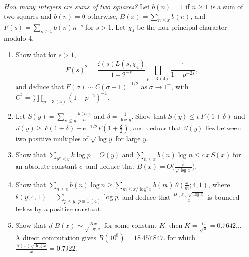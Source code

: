 \begin{exercise}[$\star\star\star$]\label{pb:twosquares}
\emph{How many integers are sums of two squares?} Let $b(n)=1$ if $n\ge1$ is a sum of two squares and $b(n)=0$ otherwise, $B(x)=\sum_{n\le x}b(n)$, and
$F(s)=\sum_{n\ge1}b(n)n^{-s}$ for $s>1$. Let $\chi_4$ be the non-principal character modulo $4$.
\begin{enumerate}[label=(\alph*)]
\item Show that for $s>1$,
\[
F(s)^2=\frac{\zeta(s)L(s,\chi_4)}{1-2^{-s}}\prod_{p\equiv3\,(4)}\frac1{1-p^{-2s}},
\]
and deduce that $F(\sigma)\sim C(\sigma-1)^{-1/2}$ as $\sigma\to1^+$, with $C^2=\frac\pi2\prod_{p\equiv3\,(4)}(1-p^{-2})^{-1}$.
\item Let $S(y)=\sum_{n\le y}\frac{b(n)}n$ and $\delta=\frac1{\log y}$. Show that $S(y)\le e\,F(1+\delta)$ and $S(y)\ge F(1+\delta)-e^{-1/2}F(1+\frac\delta2)$, and
deduce that $S(y)$ lies between two positive multiples of $\sqrt{\log y}$ for large $y$.
\item Show that $\sum_{p^k\le y}k\log p=O(y)$ and $\sum_{n\le x}b(n)\log n\le c\,x\,S(x)$ for an absolute constant $c$, and deduce that $B(x)=O\bigl(\frac x{\sqrt{\log x}}\bigr)$.
\item Show that $\sum_{n\le x}b(n)\log n\ge\sum_{m\le x/\log^3x}b(m)\,\theta(\frac xm;4,1)$, where $\theta(y;4,1)=\sum_{p\le y,\,p\equiv1\,(4)}\log p$, and
deduce that $\frac{B(x)\sqrt{\log x}}x$ is bounded below by a positive constant.
\item Show that \emph{if} $B(x)\sim\frac{Kx}{\sqrt{\log x}}$ for some constant $K$, then $K=\frac C{\sqrt\pi}=0.7642\ldots$ A direct computation gives $B(10^8)=18\,457\,847$, for which
$\frac{B(x)\sqrt{\log x}}x=0.7922$.
\end{enumerate}
\end{exercise}

